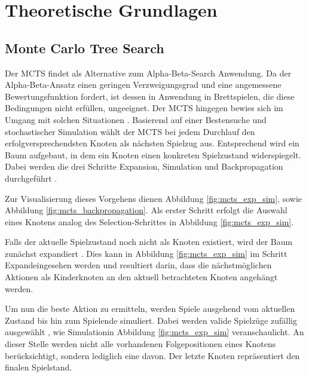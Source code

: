 \documentclass[12pt,a4paper]{article}
\begin{document}
 


\newpage

\section{Theoretische Grundlagen}

\subsection{Monte Carlo Tree Search}
Der MCTS findet als Alternative zum Alpha-Beta-Search Anwendung. Da der Alpha-Beta-Ansatz einen geringen Verzweigungsgrad und eine angemessene Bewertungsfunktion fordert, ist dessen in Anwendung in Brettspielen, die diese Bedingungen nicht erfüllen, ungeeignet. Der MCTS hingegen bewies sich im Umgang mit solchen Situationen \cite{Chaslot2008}.
Basierend auf einer Bestensuche und stochastischer Simulation  wählt der MCTS bei jedem Durchlauf den erfolgversprechendsten Knoten als nächsten Spielzug aus. Entsprechend wird ein Baum aufgebaut, in dem ein Knoten einen konkreten Spielzustand widerspiegelt\cite{Chaslot2008}. Dabei werden die drei Schritte Expansion, Simulation und Backpropagation durchgeführt \cite{Chaslot2008}.

Zur Visualisierung dieses Vorgehens dienen Abbildung \ref{fig:mcts_exp_sim}, sowie Abbildung \ref{fig:mcts_backpropagation}. 
Als erster Schritt erfolgt die Auswahl eines Knotens analog des \glqq{}Selection\grqq{}-Schrittes in Abbildung \ref{fig:mcts_exp_sim}.

Falls der aktuelle Spielzustand noch nicht als Knoten existiert, wird der Baum zunächst expandiert \cite{Chaslot2008}. Dies kann in Abbildung \ref{fig:mcts_exp_sim} im Schritt \glqq{}Expand\grqq eingesehen werden und resultiert darin, dass die nächstmöglichen Aktionen als Kinderknoten an den aktuell betrachteten Knoten angehängt werden.

Um nun die beste Aktion zu ermitteln, werden Spiele ausgehend vom aktuellen Zustand bis hin zum Spielende simuliert. Dabei werden valide Spielzüge zufällig ausgewählt \cite{Chaslot2008}, wie \glqq{}Simulation\grqq in Abbildung \ref{fig:mcts_exp_sim} veranschaulicht. An dieser Stelle werden nicht alle vorhandenen Folgepositionen eines Knotens berücksichtigt, sondern lediglich eine davon. Der letzte Knoten repräsentiert den finalen Spielstand.
\end{document}
